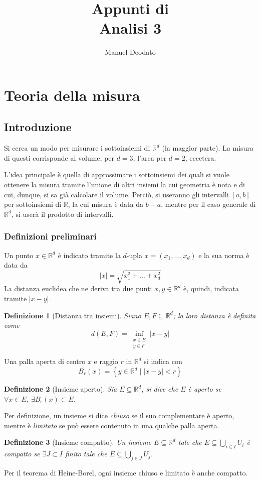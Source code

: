 \documentclass[12pt]{article}
\title{Appunti di\\ \vspace{.3cm} Analisi 3}
\author{Manuel Deodato}
\date{}
\theoremstyle{style}
\newtheorem{definizione}{Definizione}[section]
\renewcommand{\maketitle}{
\begin{center}
{\sffamily
{\fontsize{20}{20}\selectfont\MakeUppercase\thetitle}}

\vspace{0.2in}

{\large\scshape\theauthor}
\end{center}
}
\numberwithin{equation}{subsection}
\begin{document}
\maketitle
\newpage
\tableofcontents
\newpage
\section{Teoria della misura}
\subsection{Introduzione}
Si cerca un modo per misurare i sottoinsiemi di $\mathbb{R}^d$ (la maggior parte).
La misura di questi corrisponde al volume, per $d=3$, l'area per $d=2$, eccetera.

L'idea principale \`e quella di approssimare i sottoinsiemi dei quali si vuole ottenere la misura tramite l'unione di altri insiemi la cui geometria \`e nota e di cui, dunque, si sa gi\`a calcolare il volume.
Perci\`o, si useranno gli intervalli $[a,b]$ per sottoinsiemi di $\mathbb{R}$, la cui misura \`e data da $b- a$, mentre per il caso generale di $\mathbb{R}^d$, si user\`a il prodotto di intervalli.
\subsubsection{Definizioni preliminari}

Un punto $x \in \mathbb{R}^d$ \`e indicato tramite la $d$-upla $x = (x_1,\ldots,x_d)$ e la sua norma \`e data da
\[
\lvert x \rvert  = \sqrt{x_1^2 + \ldots+ x_d^2} 
\] 
La distanza euclidea che ne deriva tra due punti $x,y \in \mathbb{R}^d$ \`e, quindi, indicata tramite $\lvert x-y \rvert $. 
\begin{definizione}
	[Distanza tra insiemi]
	Siano $E,F \subseteq \mathbb{R}^d$; la loro distanza \`e definita come
	\[
		d(E,F) = \inf_{\substack{x \in E\\ y \in F}} \lvert x - y \rvert 
	\] 
\end{definizione}
Una palla aperta di centro $x$ e raggio $r$ in $\mathbb{R}^d$ si indica con
\[
B_r(x) = \left\{ y \in \mathbb{R}^d  \mid \lvert x-y \rvert <r \right\} 
\] 
\begin{definizione}
	[Insieme aperto]
	Sia $E\subseteq \mathbb{R}^d$; si dice che $E$ \`e \textit{aperto} se $\forall x \in E, \ \exists B_\epsilon (x) \subset E$.
\end{definizione}
Per definizione, un insieme si dice \textit{chiuso} se il suo complementare \`e aperto, mentre \`e \textit{limitato} se pu\`o essere contenuto in una qualche palla aperta.
\begin{definizione}
	[Insieme compatto]
	Un insieme $E \subseteq \mathbb{R}^d$ tale che $E \subseteq \bigcup_{i \in I} U_i$ \`e compatto se $\exists J \subset I$ finito tale che $E \subseteq \bigcup_{j \in J} U_j $.
\end{definizione}
Per il teorema di Heine-Borel, ogni insieme chiuso e limitato \`e anche compatto.
\end{document}
